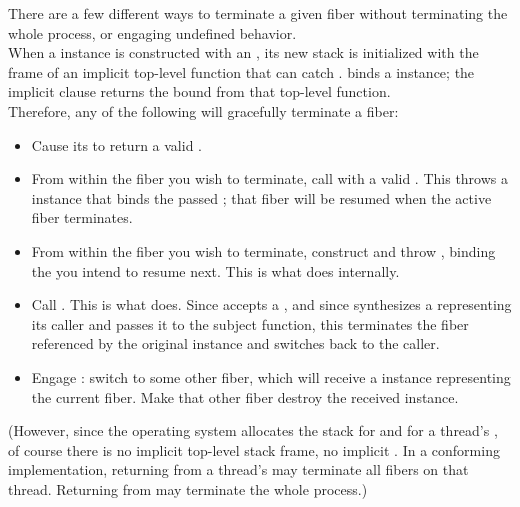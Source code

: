 
There are a few different ways to terminate a given fiber without
terminating the whole process, or engaging undefined behavior.\\

When a \fiber instance is constructed with an \entryfn, its new stack is
initialized with the frame of an implicit top-level function that can
catch \unwindex. \unwindex binds a \fiber instance; the implicit 
clause returns the bound \fiber from that top-level function.\\

Therefore, any of the following will gracefully terminate a fiber:

\begin{itemize}
    \item Cause its \entryfn to return a valid \fiber.
    \item From within the fiber you wish to terminate, call \unwindfib with a
          valid \fiber. This throws a \unwindex instance that binds the passed
          \fiber; that fiber will be resumed when the active fiber terminates.
    \item From within the fiber you wish to terminate, construct and
          throw \unwindex, binding the \fiber you intend to resume next. This
          is what \unwindfib does internally.
    \item Call . This is what \dtor
          does. Since \unwindfib accepts a \fiber, and since \resumewith
          synthesizes a \fiber representing its caller and passes it to the
          subject function, this terminates the fiber referenced by the
          original \fiber instance and switches back to the caller.
    \item Engage \dtor: switch to some other fiber, which will
          receive a \fiber instance representing the current fiber. Make that
          other fiber destroy the received \fiber instance.
\end{itemize}

(However, since the operating system allocates the stack for \main and for a
thread's \entryfn, of course there is no implicit top-level stack frame, no
implicit . In a conforming implementation,
returning from a thread's \entryfn\xspace may terminate all fibers on that
thread. Returning from \main may terminate the whole process.)\\


